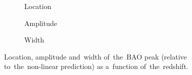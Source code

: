 \begin{figure}[tbp]
\newcommand{\corrwidth}{0.70}
\centering
	\begin{subfigure}{\corrwidth\textwidth}
	\end{subfigure}
	\begin{subfigure}{\corrwidth\textwidth}
		\centering
		\caption{Location}
	\end{subfigure}
	\begin{subfigure}{\corrwidth\textwidth}
		\centering
		\caption{Amplitude}
	\end{subfigure}
	\begin{subfigure}{\corrwidth\textwidth}
		\centering
		\caption{Width}
	\end{subfigure}
	\caption{Location, amplitude and~width of~the~BAO peak (relative to~the~non-linear prediction) as a~function of~the~redshift.}
	\label{fig:corr_peak}
\end{figure}


